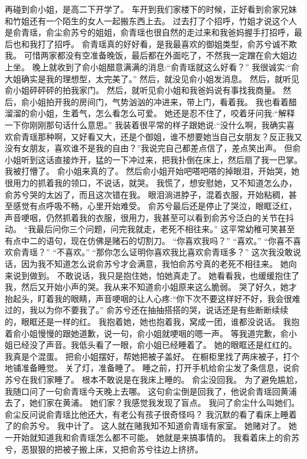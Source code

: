 再碰到俞小姐，是高二下开学了。
车开到我们家楼下的时候，正好看到俞家兄妹和竹姐还有一个陌生的女人一起搬东西上去。
过去打了个招呼，竹姐才说这个人是俞青瑶，俞尘俞苏兮的姐姐，俞青瑶也很自然的走过来和我爸妈握手打招呼，最后也和我打了招呼。
俞青瑶真的好好看，是我最喜欢的御姐类型，俞苏兮诚不欺我。
可惜两家都没有空准备晚饭，最后都在外面吃了，不然我一定蹭在俞大姐边上坐。
晚上就收到了俞小姐醋意满满的消息:“俞青瑶就这么好看？”
我很诚实:“俞大姐确实是我的理想型，太完美了。”
然后，就没见俞小姐发消息。
然后，就听见俞小姐砰砰砰的拍我家门。
然后，就听见俞小姐和我爸妈说有事找我商量。
然后，俞小姐拍开我的房间门，气势汹汹的冲进来，带上门，看着我。
我也看着醋溜溜的俞小姐，生着气，怎么看怎么可爱。
她还是忍不住了，咬着牙问我:“解释一下你刚刚那句话什么意思。”
我装着很平常的样子跟她说:“没什么啊，我确实喜欢俞青瑶那种啊，又好看又大，还是个御姐，谁不想要她当自己女朋友？反正我又没有女朋友，喜欢谁不是我的自由？”我说完自己都差点信了，差点笑出声。
但俞小姐听到这话直接炸开，猛的一下冲过来，把我扑倒在床上，然后扇了我一巴掌。
我被打懵了。
俞小姐来真的了。
然后俞小姐开始吧嗒吧嗒的掉眼泪，开始哭，她很用力的抓着我的领口，不说话，就哭。
我慌了，想安慰她，又不知道怎么办，俞苏兮哭的太凶了，而且这次错在我。 眼泪淌进脖子，混着衣服，开始粘稠，甚至感觉有点呼吸不畅，心里开始难受。
俞苏兮最后还是停止了哭泣，眼眶泛红，声音哽咽，仍然抓着我的衣服，很用力，我甚至可以看到俞苏兮泛白的关节在抖动。
“我最后问你三个问题，问完我就走，老死不相往来。” 这平常幼稚可笑甚至有点中二的语句，现在仿佛是赌石的切割刀。
“你喜欢我吗？”
“喜欢。”
“你喜不喜欢俞青瑶？”
“不喜欢。”
“那你怎么证明你喜欢我比喜欢俞青瑶多？”
这次我没敢说话，因为我不知道怎么说俞苏兮才会满意，我怕俞苏兮真的老死不相往来。
她向来说到做到。
不敢说话，我只是抱住她，怕她真走了。
她看看我，也缓缓抱住了我，然后又开始小声的哭。我从来不知道俞小姐原来这么脆弱。
哭了好久，她才抬起头，盯着我的眼睛，声音哽咽的让人心疼:“你下次不要这样好不好，我会很难过的，我以为你不要我了。”
俞苏兮还在抽抽搭搭的哭，说话还是有些断断续续的，眼眶还是一样的红。
我抱着她，她也抱着我，窝成一团，谁都没说话。
我抱着俞小姐慢慢的跟她道歉，说一句，俞小姐就哽咽的嗯一声。
等我道完歉，俞小姐已经没了声音。我低头看了一眼，俞小姐已经睡着了。
她的眼眶还是红红的。
我真是个混蛋。
把俞小姐摆好，帮她把被子盖好。
在橱柜里找了两床被子，打个地铺准备睡觉。 关了灯，准备睡了。
睡之前，打开手机给俞尘发了条信息，说俞苏兮在我们家睡了。 根本不敢说是在我床上睡的。
俞尘没回我。
为了避免尴尬，我随口问了一句俞青瑶今天晚上去哪。
这句俞尘倒是回我了，他说俞青瑶回黄浦去了，她们家在黄浦。
她们家？我感觉我发现了盲点。
我问了俞尘什么叫她们。
俞尘反问说俞青瑶比他还大，有老公有孩子很奇怪吗？
我沉默的看了看床上睡着了的俞苏兮。
我中计了。
这人就在赌我知不知道俞青瑶有家室。
她赌对了。
她一开始就知道我和俞青瑶怎么都不可能。
她就是来搞事情的。
我看着床上的俞苏兮，恶狠狠的把被子搬上床，又把俞苏兮往边上挤挤。

